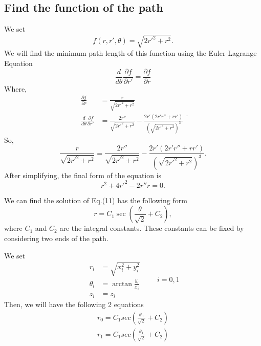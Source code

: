 \documentclass[%
 reprint,
 amsmath,amssymb,
 aps,
]{revtex4-1}
\begin{document}
\subsection{\label{sec:level2}Find the function of the path}
We set
\begin{equation}
    f(r,r',\theta)=\sqrt{2r'^2+r^2}.
\end{equation}
We will find the minimum path length of this function using the Euler-Lagrange Equation
\begin{equation}
\frac{d}{d\theta}\frac{\partial f}{\partial r'}=\frac{\partial f}{\partial r}
\end{equation}
Where,
\begin{equation}
\begin{aligned}
\frac{\partial f}{\partial r}&=\frac{r}{\sqrt{2r'^2+r^2}}
\\\frac{d}{d\theta}\frac{\partial f}{\partial r'}&=\frac{2r''}{\sqrt{2r'^2+r^2}}-\frac{2r'(2r'r''+rr')}{(\sqrt{2r'^2+r^2})^3}
\end{aligned}.
\end{equation}
So,
\begin{equation}
    \frac{r}{\sqrt{2r'^2+r^2}}=\frac{2r''}{\sqrt{2r'^2+r^2}}-\frac{2r'(2r'r''+rr')}{(\sqrt{2r'^2+r^2})^3}.
\end{equation}
After simplifying, the final form of the equation is
\begin{equation}
    r^2+4r'^2-2r''r=0.
\end{equation}

We can find the solution of Eq.(11) has the following form
\begin{equation}
    r=C_1\sec{(\frac{\theta}{\sqrt{2}}+C_2)},
\end{equation}
where $C_1$ and $C_2$ are the integral constants. These constants can be fixed by considering two ends of the path.

We set
\begin{equation}
\begin{aligned}
    r_i&=\sqrt{x_i^2+y_i^2}\\
    \theta_i&=\arctan{\frac{y_i}{x_i}}
    \\z_i&=z_i
\end{aligned}\qquad i=0,1
\end{equation}
Then, we will have the following 2 equations
\begin{equation}
\begin{aligned}
r_0=C_1sec{(\frac{\theta_0}{\sqrt{2}}+C_2)}
\\r_1=C_1sec{(\frac{\theta_1}{\sqrt{2}}+C_2)}
\end{aligned}
\end{equation}
\end{document}
